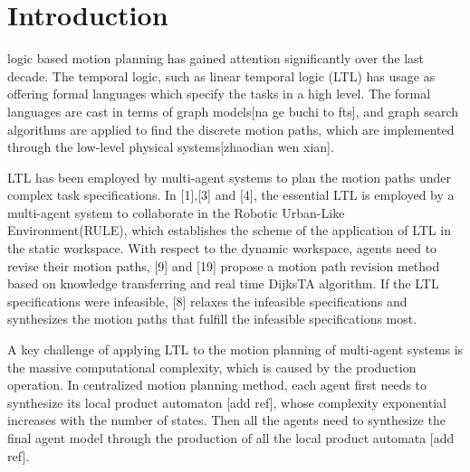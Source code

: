 \documentclass[journal]{IEEEtran}
\begin{document}
\section{Introduction}
%
%
%
%
 logic based motion planning has gained attention significantly over the last decade. The temporal logic, such as linear temporal logic (LTL) has usage as offering formal languages which specify the tasks in a high level. The formal languages are cast in terms of graph models[na ge buchi to fts], and graph search algorithms are applied to find the discrete motion paths, which are implemented through the low-level physical systems[zhaodian wen xian].\par
LTL has been employed by multi-agent systems to plan the motion paths under complex task specifications. In [1],[3] and [4], the essential LTL is employed by a multi-agent system to collaborate in the Robotic Urban-Like Environment(RULE), which establishes the scheme of the application of LTL in the static workspace. With respect to the dynamic workspace, agents need to revise their motion paths, [9] and [19] propose a motion path revision method based on knowledge transferring and real time DijksTA algorithm. If the LTL specifications were infeasible, [8] relaxes the infeasible specifications and synthesizes the motion paths that fulfill the infeasible specifications most. \par
A key challenge of applying LTL to the motion planning of multi-agent systems is the massive computational complexity, which is caused by the production operation. In centralized motion planning method, each agent first needs to synthesize its local product automaton [add ref], whose complexity exponential increases with the number of states. Then all the agents need to synthesize the final agent model through the production of all the local product automata [add ref].

\end{document}
